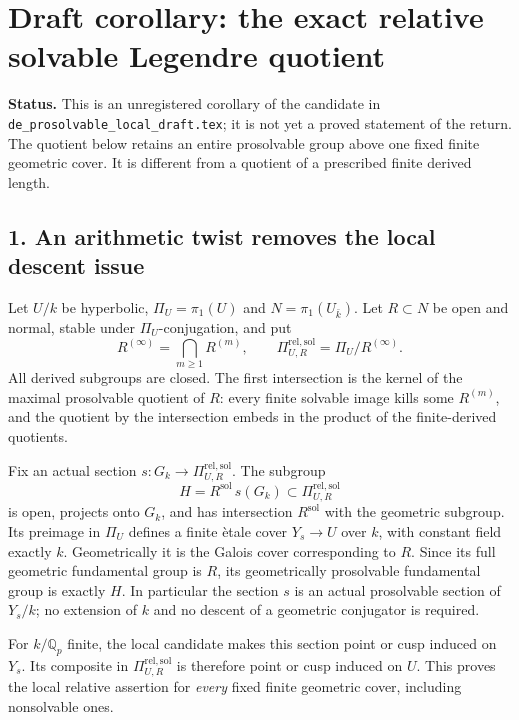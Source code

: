 \section*{Draft corollary: the exact relative solvable Legendre quotient}

\noindent\textbf{Status.}
This is an unregistered corollary of the candidate in
\texttt{de\_prosolvable\_local\_draft.tex}; it is not yet a proved
statement of the return.  The quotient below retains an entire
prosolvable group above one fixed finite geometric cover.  It is
different from a quotient of a prescribed finite derived length.

\subsection*{1. An arithmetic twist removes the local descent issue}

Let $U/k$ be hyperbolic, $\Pi_U=\pi_1(U)$ and
$N=\pi_1(U_{\bar k})$.  Let $R\subset N$ be open and normal,
stable under $\Pi_U$-conjugation, and put
\[
 R^{(\infty)}=\bigcap_{m\ge1}R^{(m)},\qquad
 \Pi_{U,R}^{\mathrm{rel,sol}}
      =\Pi_U/R^{(\infty)}.
\]
All derived subgroups are closed.  The first intersection is the
kernel of the maximal prosolvable quotient of $R$: every finite
solvable image kills some $R^{(m)}$, and the quotient by the
intersection embeds in the product of the finite-derived quotients.

Fix an actual section $s:G_k\to\Pi_{U,R}^{\mathrm{rel,sol}}$.
The subgroup
\[
             H=R^{\mathrm{sol}}\,s(G_k)
                 \subset\Pi_{U,R}^{\mathrm{rel,sol}}
\]
is open, projects onto $G_k$, and has intersection
$R^{\mathrm{sol}}$ with the geometric subgroup.  Its preimage in
$\Pi_U$ defines a finite \`etale cover $Y_s\to U$ over $k$, with
constant field exactly $k$.  Geometrically it is the Galois cover
corresponding to $R$.  Since its full geometric fundamental group
is $R$, its geometrically prosolvable fundamental group is exactly
$H$.  In particular the section $s$ is an actual prosolvable section
of $Y_s/k$; no extension of $k$ and no descent of a geometric
conjugator is required.

For $k/\mathbb Q_p$ finite, the local candidate makes this section
point or cusp induced on $Y_s$.  Its composite in
$\Pi_{U,R}^{\mathrm{rel,sol}}$ is therefore point or cusp induced
on $U$.  This proves the local relative assertion for \emph{every}
fixed finite geometric cover, including nonsolvable ones.

